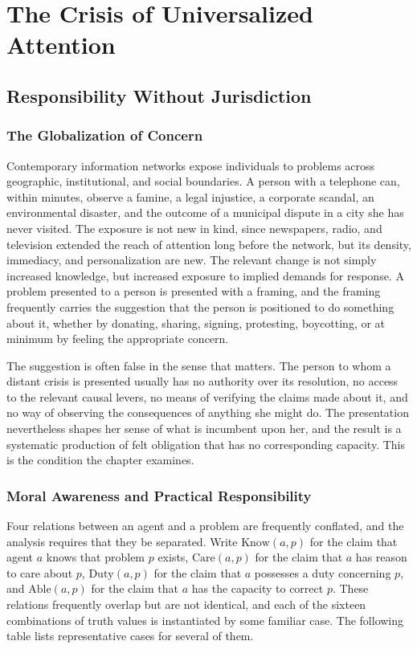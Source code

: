 \documentclass[11pt]{report}
\theoremstyle{definition}
\theoremstyle{remark}
\begin{document}
\part{The Crisis of Universalized Attention}

\chapter{Responsibility Without Jurisdiction}

\section{The Globalization of Concern}

Contemporary information networks expose individuals to problems across geographic, institutional, and social boundaries. A person with a telephone can, within minutes, observe a famine, a legal injustice, a corporate scandal, an environmental disaster, and the outcome of a municipal dispute in a city she has never visited. The exposure is not new in kind, since newspapers, radio, and television extended the reach of attention long before the network, but its density, immediacy, and personalization are new. The relevant change is not simply increased knowledge, but increased exposure to implied demands for response. A problem presented to a person is presented with a framing, and the framing frequently carries the suggestion that the person is positioned to do something about it, whether by donating, sharing, signing, protesting, boycotting, or at minimum by feeling the appropriate concern.

The suggestion is often false in the sense that matters. The person to whom a distant crisis is presented usually has no authority over its resolution, no access to the relevant causal levers, no means of verifying the claims made about it, and no way of observing the consequences of anything she might do. The presentation nevertheless shapes her sense of what is incumbent upon her, and the result is a systematic production of felt obligation that has no corresponding capacity. This is the condition the chapter examines.

\section{Moral Awareness and Practical Responsibility}

Four relations between an agent and a problem are frequently conflated, and the analysis requires that they be separated. Write $\mathrm{Know}(a,p)$ for the claim that agent $a$ knows that problem $p$ exists, $\mathrm{Care}(a,p)$ for the claim that $a$ has reason to care about $p$, $\mathrm{Duty}(a,p)$ for the claim that $a$ possesses a duty concerning $p$, and $\mathrm{Able}(a,p)$ for the claim that $a$ has the capacity to correct $p$. These relations frequently overlap but are not identical, and each of the sixteen combinations of truth values is instantiated by some familiar case. The following table lists representative cases for several of them.
\end{document}
